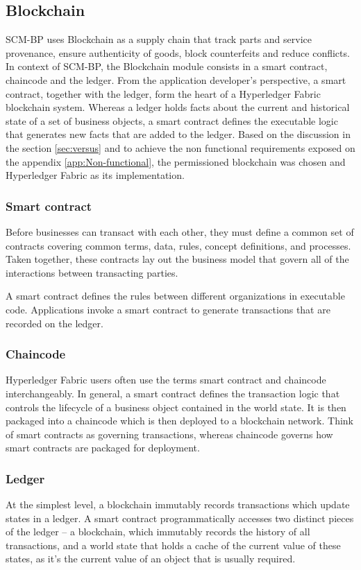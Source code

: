 \subsection{Blockchain}\label{sec:BlockchainModule}

SCM-BP uses Blockchain as a supply chain that track parts and service provenance, ensure authenticity of goods, block counterfeits and reduce conflicts. In context of SCM-BP, the Blockchain module consists in a smart contract, chaincode and the ledger. From the application developer’s perspective, a smart contract, together with the ledger, form the heart of a Hyperledger Fabric blockchain system. Whereas a ledger holds facts about the current and historical state of a set of business objects, a smart contract defines the executable logic that generates new facts that are added to the ledger. 
Based on the discussion in the section \ref{sec:versus} and to achieve the non functional requirements exposed on the appendix \ref{app:Non-functional}, the permissioned blockchain was chosen and Hyperledger Fabric as its implementation. 

\subsubsection{Smart contract}
Before businesses can transact with each other, they must define a common set of contracts covering common terms, data, rules, concept definitions, and processes. Taken together, these contracts lay out the business model that govern all of the interactions between transacting parties.

A smart contract defines the rules between different organizations in executable code. Applications invoke a smart contract to generate transactions that are recorded on the ledger.

\subsubsection{Chaincode}
Hyperledger Fabric users often use the terms smart contract and chaincode interchangeably. In general, a smart contract defines the transaction logic that controls the lifecycle of a business object contained in the world state. It is then packaged into a chaincode which is then deployed to a blockchain network. Think of smart contracts as governing transactions, whereas chaincode governs how smart contracts are packaged for deployment.

\subsubsection{Ledger}
At the simplest level, a blockchain immutably records transactions which update states in a ledger. A smart contract programmatically accesses two distinct pieces of the ledger – a blockchain, which immutably records the history of all transactions, and a world state that holds a cache of the current value of these states, as it’s the current value of an object that is usually required.

